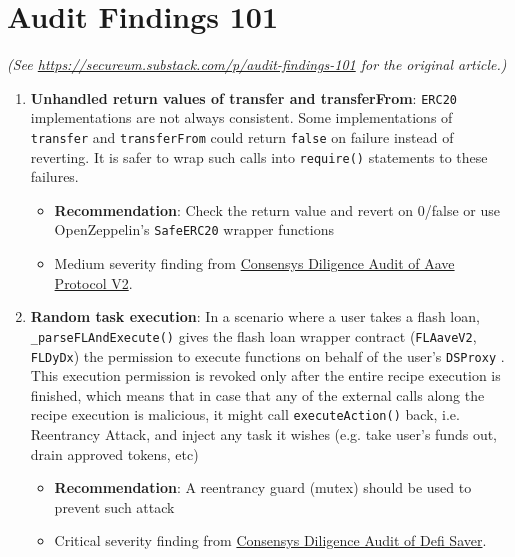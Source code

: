 \section{Audit Findings 101}

\textit{(See \url{https://secureum.substack.com/p/audit-findings-101} for the original article.)}\\

\begin{enumerate}
\item\textbf{Unhandled return values of transfer and transferFrom}: \verb|ERC20| implementations are not always consistent. Some implementations of \verb|transfer| and \verb|transferFrom| could return \verb|false| on failure instead of reverting. It is safer to wrap such calls into \verb|require()| statements to these failures.
	\begin{itemize}
	\item\textbf{Recommendation}: Check the return value and revert on 0/false or use OpenZeppelin’s \verb|SafeERC20| wrapper functions
	\item Medium severity finding from \href{https://consensys.net/diligence/audits/2020/09/aave-protocol-v2/\#unhandled-return-values-of-transfer-and-transferfrom}{Consensys Diligence Audit of Aave Protocol V2}.
	\end{itemize}

\item\textbf{Random task execution}: In a scenario where a user takes a flash loan, \verb|_parseFLAndExecute()| gives the flash loan wrapper contract (\verb|FLAaveV2|, \verb|FLDyDx|) the permission to execute functions on behalf of the user’s \verb|DSProxy| . This execution permission is revoked only after the entire recipe execution is finished, which means that in case that any of the external calls along the recipe execution is malicious, it might call \verb|executeAction()|  back, i.e. Reentrancy Attack, and inject any task it wishes (e.g. take user’s funds out, drain approved tokens, etc)
	\begin{itemize}
	\item\textbf{Recommendation}: A reentrancy guard (mutex) should be used to prevent such attack
	\item Critical severity finding from \href{https://consensys.net/diligence/audits/2021/03/defi-saver/\#random-task-execution}{Consensys Diligence Audit of Defi Saver}.
	\end{itemize}


\end{enumerate}
